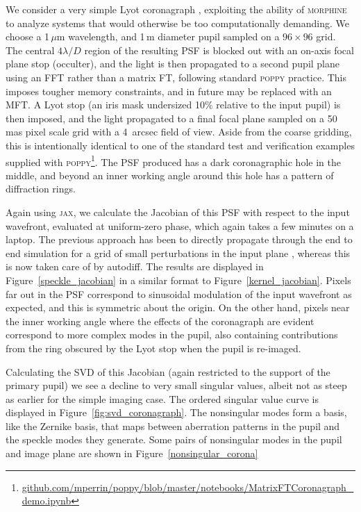 \documentclass[modern]{aastex63}
\begin{document}
We consider a very simple Lyot coronagraph \citep{lyot30}, exploiting the ability of \textsc{morphine} to analyze systems that would otherwise be too computationally demanding. We choose a 1\,$\mu$m wavelength, and 1\,m diameter pupil sampled on a $96\times96$ grid. The central $4 \lambda/D$ region of the resulting PSF is blocked out with an on-axis focal plane stop (occulter), and the light is then propagated to a second pupil plane using an FFT rather than a matrix FT, following standard \textsc{poppy} practice. This imposes tougher memory constraints, and in future may be replaced with an MFT. A Lyot stop (an iris mask undersized 10\% relative to the input pupil) is then imposed, and the light propagated to a final focal plane sampled on a 50\,mas pixel scale grid with a 4~arcsec field of view. Aside from the coarse gridding, this is intentionally identical to one of the standard test and verification examples supplied with \textsc{poppy}\footnote{\href{https://github.com/mperrin/poppy/blob/master/notebooks/MatrixFTCoronagraph_demo.ipynb}{github.com/mperrin/poppy/blob/master/notebooks/MatrixFTCoronagraph\_demo.ipynb}}. The PSF produced has a dark coronagraphic hole in the middle, and beyond an inner working angle around this hole has a pattern of diffraction rings.

Again using \textsc{jax}, we calculate the Jacobian of this PSF with respect to the input wavefront, evaluated at uniform-zero phase, which again takes a few minutes on a laptop. The previous approach has been to directly propagate through the end to end simulation for a grid of small perturbations in the input plane \citep{falco}, whereas this is now taken care of by autodiff. The results are displayed in Figure~\ref{speckle_jacobian} in a similar format to Figure~\ref{kernel_jacobian}. Pixels far out in the PSF correspond to sinusoidal modulation of the input wavefront as expected, and this is symmetric about the origin. On the other hand, pixels near the inner working angle where the effects of the coronagraph are evident correspond to more complex modes in the pupil, also containing contributions from the ring obscured by the Lyot stop when the pupil is re-imaged. 

Calculating the SVD of this Jacobian (again restricted to the support of the primary pupil) we see a decline to very small singular values, albeit not as steep as earlier for the simple imaging case. The ordered singular value curve is displayed in Figure~\ref{fig:svd_coronagraph}. The nonsingular modes form a basis, like the Zernike basis, that maps between aberration patterns in the pupil and the speckle modes they generate. Some pairs of nonsingular modes in the pupil and image plane are shown in Figure~\ref{nonsingular_corona}
\end{document}
